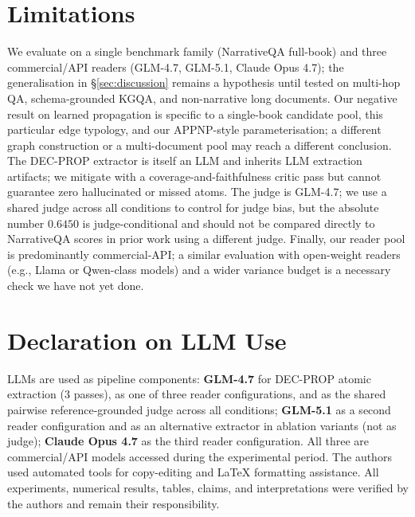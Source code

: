 \documentclass{article}
\theoremstyle{plain}
\theoremstyle{definition}
\theoremstyle{remark}
\begin{document}
\section{Limitations}
We evaluate on a single benchmark family (NarrativeQA full-book) and three
commercial/API readers (GLM-4.7, GLM-5.1, Claude Opus 4.7); the
generalisation in \S\ref{sec:discussion} remains a hypothesis until tested
on multi-hop QA, schema-grounded KGQA, and non-narrative long documents.
Our negative result on learned propagation is specific to a single-book
candidate pool, this particular edge typology, and our APPNP-style
parameterisation; a different graph construction or a multi-document pool
may reach a different conclusion. The DEC-PROP extractor is itself an LLM
and inherits LLM extraction artifacts; we mitigate with a
coverage-and-faithfulness critic pass but cannot guarantee zero hallucinated
or missed atoms. The judge is GLM-4.7; we use a shared judge across all
conditions to control for judge bias, but the absolute number $0.6450$ is
judge-conditional and should not be compared directly to NarrativeQA scores
in prior work using a different judge. Finally, our reader pool is
predominantly commercial-API; a similar evaluation with open-weight readers
(e.g., Llama or Qwen-class models) and a wider variance budget is a
necessary check we have not yet done.

\section*{Declaration on LLM Use}
LLMs are used as pipeline components: \textbf{GLM-4.7} for DEC-PROP atomic
extraction (3 passes), as one of three reader configurations, and as the
shared pairwise reference-grounded judge across all conditions; \textbf{GLM-5.1}
as a second reader configuration and as an alternative extractor in
ablation variants (not as judge); \textbf{Claude Opus 4.7} as the third
reader configuration. All three are commercial/API models accessed during
the experimental period. The authors used automated tools for copy-editing
and LaTeX formatting assistance. All experiments, numerical results,
tables, claims, and interpretations were verified by the authors and
remain their responsibility.


\nocite{khattab2022colbertv2,choi2021decontext,davidson1967logical,
  edge2024graphrag,gutierrez2024hipporag,sarthi2024raptor,klein2024appnp,
  karpukhin2020dpr,kovcisky2018narrativeqa,liu2024lostinmiddle,
  xiao2023bgem3,reimers2019sentencebert}



\end{document}
